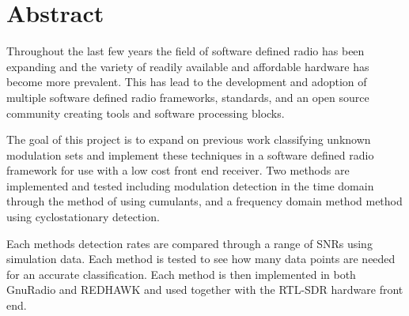\chapter{Abstract}

Throughout the last few years the field of software defined radio has been
expanding and the variety of readily available and affordable hardware has
become more prevalent.  This has lead to the development and adoption of
multiple software defined radio frameworks, standards, and an open source
community creating tools and software processing blocks.  

The goal of this project is to expand on previous work classifying unknown
modulation sets and implement these techniques in a software defined radio
framework for use with a low cost front end receiver.  Two methods are
implemented and tested including modulation detection in the time domain through
the method of using cumulants, and a frequency domain method method using
cyclostationary detection.

Each methods detection rates are compared through a range of SNRs using
simulation data.  Each method is tested to see how many data points are needed
for an accurate classification. Each method is then implemented in both GnuRadio
and REDHAWK and used together with the RTL-SDR hardware front end. 
